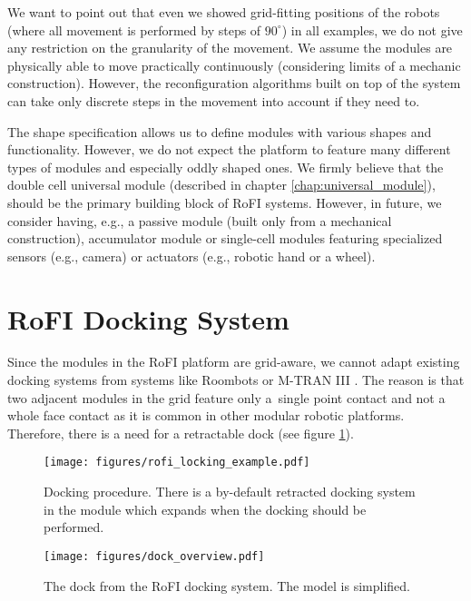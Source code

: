 We want to point out that even we showed grid-fitting positions of the robots
(where all movement is performed by steps of $90^\circ$) in all examples, we do
not give any restriction on the granularity of the movement. We assume the
modules are physically able to move practically continuously (considering limits
of a mechanic construction). However, the reconfiguration algorithms built on
top of the system can take only discrete steps in the movement into account if
they need to.

The shape specification allows us to define modules with various shapes and
functionality. However, we do not expect the platform to feature many different
types of modules and especially oddly shaped ones. We firmly believe that the
double cell universal module (described in chapter \ref{chap:universal_module}),
should be the primary building block of RoFI systems. However, in future, we
consider having, e.g., a passive module (built only from a mechanical
construction), accumulator module or single-cell modules featuring specialized
sensors (e.g., camera) or actuators (e.g., robotic hand or a wheel).

\section{RoFI Docking System}\label{sec:dock}

Since the modules in the RoFI platform are grid-aware, we cannot adapt existing
docking systems from systems like Roombots \cite{bonardi_locomotion_2012} or
M-TRAN III \cite{kurokawa_distributed_2008}. The reason is that two adjacent
modules in the grid feature only a~single point contact and not a whole face
contact as it is common in other modular robotic platforms. Therefore, there is
a need for a retractable dock (see figure \ref{fig:rofi_locking_example}).

\begin{figure}[t]
    \centering
    \texttt{[image: figures/rofi\_locking\_example.pdf]}
    \caption{Docking procedure. There is a by-default retracted docking system
    in the module which expands when the docking should be performed.}
    \label{fig:rofi_locking_example}
\end{figure}


\begin{figure}[t]
    \centering
    \texttt{[image: figures/dock\_overview.pdf]}
    \caption{The dock from the RoFI docking system. The model is simplified.}
    \label{fig:dock_overview}
\end{figure}

